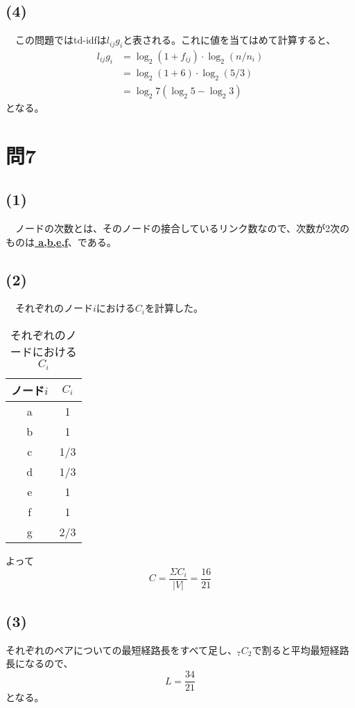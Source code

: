 \documentclass[a4j]{jarticle} %
\begin{document}
\subsection*{(4)}
　この問題ではtd-idfは$l_{ij}g_i$と表される。これに値を当てはめて計算すると、
\begin{align*}
  l_{ij}g_i &= \log_2 (1+f_{ij})\cdot \log_2(n/n_i) \\
  &= \log_2 (1+6)\cdot \log_2(5/3) \\
  &= \log_2 7 (\log_2 5 - \log_2 3)
\end{align*}
となる。

\section*{問7}
\subsection*{(1)}
　ノードの次数とは、そのノードの接合しているリンク数なので、次数が2次のものは\textbf{\underline{ a,b,e,f}}、である。
\subsection*{(2)}
　それぞれのノード$i$における$C_i$を計算した。
 \begin{table}[H]
    \centering
    \caption{それぞれのノードにおける$C_i$}
    \label{tab:hogehoge}
    \begin{tabular}{cc} \hline
    ノード$i$ & $C_i$ \\ \hline
    a & 1 \\
    b & 1 \\
    c & 1/3 \\
    d & 1/3 \\
    e & 1 \\
    f & 1 \\
    g & 2/3 \\ \hline
    \end{tabular}
\end{table}
よって
\begin{equation}
  C = \dfrac{\Sigma C_i}{|V|} = \dfrac{16}{21}
\end{equation}
\subsection*{(3)}
それぞれのペアについての最短経路長をすべて足し、$_7C_2$で割ると平均最短経路長になるので、
\begin{equation}
  L = \dfrac{34}{21}
\end{equation}
となる。
\end{document}
